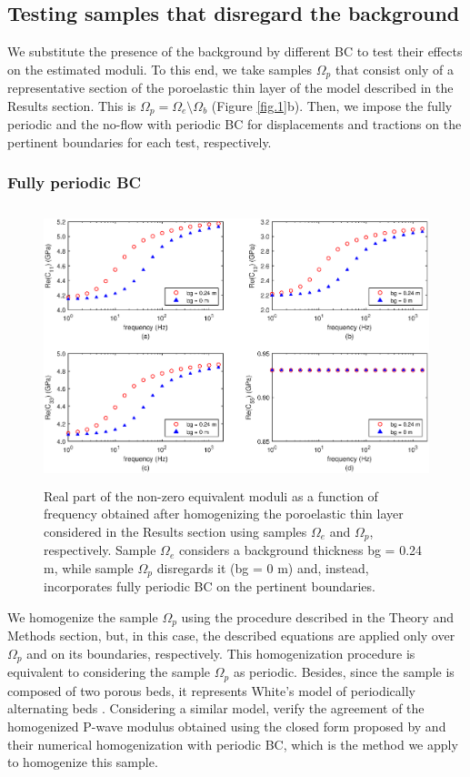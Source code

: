 \documentclass[draft]{agujournal2019}
\begin{document}
\subsection{Testing samples that disregard the background}
We substitute the presence of the background by different BC to test their effects on the estimated moduli. 
To this end,
we take samples $\Omega_p$ that consist only of a representative section of the poroelastic thin layer of the model described in the Results section.
This is $\Omega_p = \Omega_e  \setminus \Omega_b $ (Figure \ref{fig.1}b). Then, we impose the fully periodic and the no-flow with periodic BC for displacements and tractions on the pertinent boundaries for each test, respectively. 

\subsubsection{Fully periodic BC}
\begin{figure}[!ht]
\centering
        \includegraphics[width= 120mm, height=80mm]{Figure4.eps}
\caption{Real part of the non-zero equivalent moduli as a function of frequency obtained after homogenizing the poroelastic thin layer considered in the Results section using samples $\Omega_e$ and $\Omega_p$, respectively. Sample $\Omega_e$ considers a background thickness bg = 0.24 m, while sample $\Omega_p$ disregards it (bg = 0 m) and, instead, incorporates fully periodic BC on the pertinent boundaries. }
\label{fig.4}
\end{figure}

We homogenize the sample $\Omega_p$ using the procedure described in the Theory and Methods section, but, in this case, the described equations are applied only  over $\Omega_p$ and on its boundaries, respectively. 
This homogenization procedure is equivalent to considering the sample $\Omega_p$ as periodic. Besides, since the sample is composed of two porous beds, it represents White's model of periodically alternating beds \cite{White1975}. Considering a similar model,  verify the agreement of the homogenized P-wave modulus obtained using the closed form proposed by  and their numerical homogenization with periodic BC, which is the method we apply to homogenize this sample.
\end{document}
